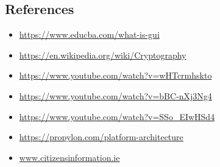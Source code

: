 \subsection{References}

\begin{itemize}
	\item \url{https://www.educba.com/what-is-gui}
	\item \url{https://en.wikipedia.org/wiki/Cryptography}
	\item \url{https://www.youtube.com/watch?v=wHTcrmhskto}
	\item \url{https://www.youtube.com/watch?v=bBC-nXj3Ng4}
	\item \url{https://www.youtube.com/watch?v=SSo_EIwHSd4}
	\item \url{https://propylon.com/platform-architecture}
	\item \url{www.citizensinformation.ie}
\end{itemize}

